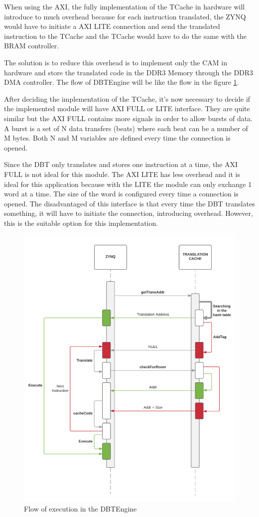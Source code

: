 When using the AXI, the fully implementation of the TCache in hardware will introduce to much overhead because for each instruction translated, the ZYNQ would have to initiate a AXI LITE connection and send the translated instruction to the TCache and the TCache would have to do the same with the BRAM controller.

The solution is to reduce this overhead is to implement only the CAM in hardware and store the translated code in the DDR3 Memory through the DDR3 DMA controller. The flow of DBTEngine will be like the flow in the figure \ref{fig:flow}. 

After deciding the implementation of the TCache, it's now necessary to decide if the implemented module will have AXI FULL or LITE interface. They are quite similar but the AXI FULL contains more signals in order to allow bursts of data. A burst is a set of N data transfers (beats) where each beat can be a number of M bytes. Both N and M variables are defined every time the connection is opened. 

Since the DBT only translates and stores one instruction at a time, the AXI FULL is not ideal for this module. The AXI LITE has less overhead and it is ideal for this application because with the LITE the module can only exchange 1 word at a time. The size of the word is configured every time a connection is opened. The disadvantaged of this interface is that every time the DBT translates something, it will have to initiate the connection, introducing overhead. However, this is the suitable option for this implementation.

\begin{figure} [H]
	\centering
	\includegraphics[scale = 0.12]{Images/flow.png}
	\caption{Flow of execution in the DBTEngine}
	\label{fig:flow}
\end{figure}
